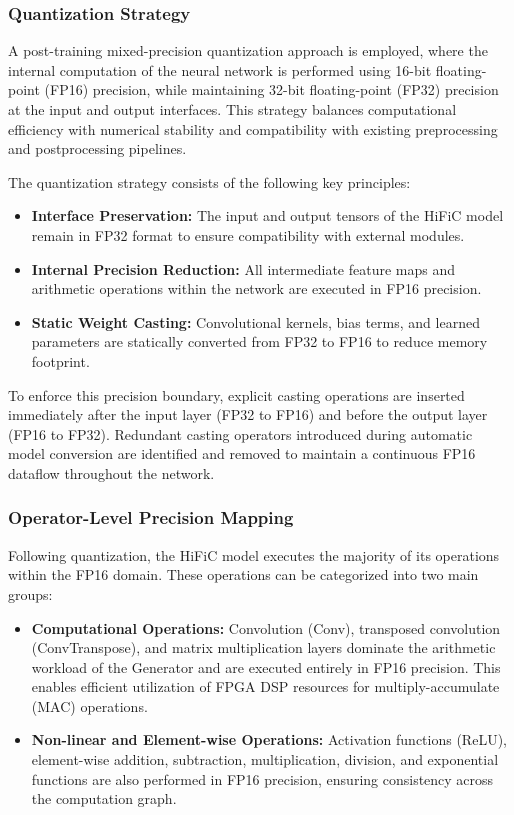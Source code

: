 \subsubsection{Quantization Strategy}

A post-training mixed-precision quantization approach is employed, where the internal computation of the neural network is performed using 16-bit floating-point (FP16) precision, while maintaining 32-bit floating-point (FP32) precision at the input and output interfaces. This strategy balances computational efficiency with numerical stability and compatibility with existing preprocessing and postprocessing pipelines.

The quantization strategy consists of the following key principles:
\begin{itemize}
    \item \textbf{Interface Preservation:} The input and output tensors of the HiFiC model remain in FP32 format to ensure compatibility with external modules.
    \item \textbf{Internal Precision Reduction:} All intermediate feature maps and arithmetic operations within the network are executed in FP16 precision.
    \item \textbf{Static Weight Casting:} Convolutional kernels, bias terms, and learned parameters are statically converted from FP32 to FP16 to reduce memory footprint.
\end{itemize}

To enforce this precision boundary, explicit casting operations are inserted immediately after the input layer (FP32 to FP16) and before the output layer (FP16 to FP32). Redundant casting operators introduced during automatic model conversion are identified and removed to maintain a continuous FP16 dataflow throughout the network.

\subsubsection{Operator-Level Precision Mapping}

Following quantization, the HiFiC model executes the majority of its operations within the FP16 domain. These operations can be categorized into two main groups:

\begin{itemize}
    \item \textbf{Computational Operations:} Convolution (Conv), transposed convolution (ConvTranspose), and matrix multiplication layers dominate the arithmetic workload of the Generator and are executed entirely in FP16 precision. This enables efficient utilization of FPGA DSP resources for multiply-accumulate (MAC) operations.
    \item \textbf{Non-linear and Element-wise Operations:} Activation functions (ReLU), element-wise addition, subtraction, multiplication, division, and exponential functions are also performed in FP16 precision, ensuring consistency across the computation graph.
\end{itemize}

